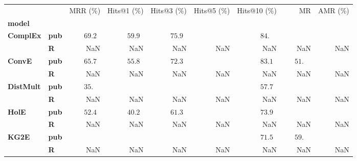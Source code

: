 \begin{tabular}{llrrrrrrr}
\toprule
       &   &           MRR (\%) &        Hits@1 (\%) &        Hits@3 (\%) & Hits@5 (\%) &       Hits@10 (\%) &                              MR & AMR (\%) \\
\textbf{model} & {} &                    &                    &                    &             &                    &                                 &          \\
\midrule
\textbf{ComplEx} & \textbf{pub} &  $69.2\phantom{0}$ &  $59.9\phantom{0}$ &  $75.9\phantom{0}$ &             &  $84.\phantom{00}$ &                                 &          \\
       & \textbf{R} &                NaN &                NaN &                NaN &         NaN &                NaN &                             NaN &      NaN \\\midrule
\textbf{ConvE} & \textbf{pub} &  $65.7\phantom{0}$ &  $55.8\phantom{0}$ &  $72.3\phantom{0}$ &             &  $83.1\phantom{0}$ &  $\phantom{000}51.\phantom{00}$ &          \\
       & \textbf{R} &                NaN &                NaN &                NaN &         NaN &                NaN &                             NaN &      NaN \\\midrule
\textbf{DistMult} & \textbf{pub} &  $35.\phantom{00}$ &                    &                    &             &  $57.7\phantom{0}$ &                                 &          \\
       & \textbf{R} &                NaN &                NaN &                NaN &         NaN &                NaN &                             NaN &      NaN \\\midrule
\textbf{HolE} & \textbf{pub} &  $52.4\phantom{0}$ &  $40.2\phantom{0}$ &  $61.3\phantom{0}$ &             &  $73.9\phantom{0}$ &                                 &          \\
       & \textbf{R} &                NaN &                NaN &                NaN &         NaN &                NaN &                             NaN &      NaN \\\midrule
\textbf{KG2E} & \textbf{pub} &                    &                    &                    &             &  $71.5\phantom{0}$ &  $\phantom{000}59.\phantom{00}$ &          \\
       & \textbf{R} &                NaN &                NaN &                NaN &         NaN &                NaN &                             NaN &      NaN \\\midrule

\end{tabular}
